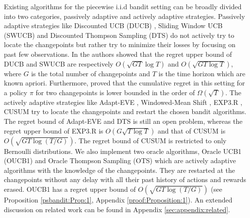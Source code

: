Existing algorithms for the piecewise i.i.d bandit setting can be broadly divided into two categories, passively adaptive and actively adaptive strategies. Passively adaptive strategies like Discounted UCB (DUCB) \citep{kocsis2006discounted}, Sliding Window UCB (SWUCB) \citep{garivier2011upper} and Discounted Thompson Sampling (DTS) \citep{raj2017taming} do not actively try to locate the changepoints but rather try to minimize their losses by focusing on past few observations. In \citet{garivier2011upper} the authors showed that the regret upper bound of DUCB and SWUCB are respectively $O( \sqrt{GT}\log T)$ and $O(\sqrt{GT\log T} )$, where $G$ is the total number of changepoints and $T$ is the time horizon which are known apriori. Furthermore, \citet{garivier2011upper} proved that the cumulative regret in this setting for a policy $\pi$ for two changepoints   is lower bounded in the order of $\Omega( \sqrt{T})$. The actively adaptive strategies like Adapt-EVE \citep{hartland2007change}, Windowed-Mean Shift \citep{yu2009piecewise}, EXP3.R  \citep{allesiardo2017non}, CUSUM \citep{liu2017change} try to locate the changepoints and restart the chosen bandit algorithms. The regret bound of Adapt-EVE and DTS is still an open problem, whereas the regret upper bound of EXP3.R is $O(G\sqrt{T\log T})$ and that of CUSUM is $O( \sqrt{GT\log({T}/{G})})$. The regret bound of CUSUM is restricted to only Bernoulli distributions. We also implement two oracle algorithms, Oracle UCB1 (OUCB1) and Oracle Thompson Sampling (OTS) which are actively adaptive algorithms with the knowledge of the changepoints. They are restarted at the changepoints without any delay with all their past history of actions and rewards erased. OUCB1  has a regret upper bound of $O(\sqrt{GT\log({T}/{G})})$ (see Proposition \ref{psbandit:Prop:1}, Appendix \ref{proof:Proposition:1}). An extended discussion on related work can be found in Appendix \ref{sec:appendix:related}.


